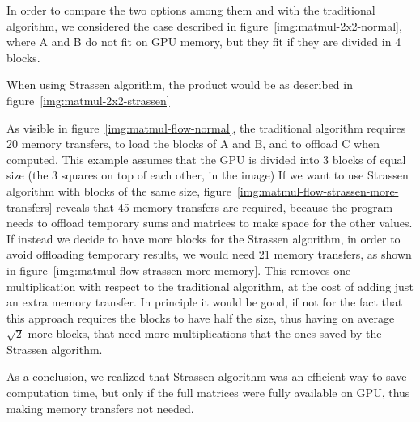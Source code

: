 In order to compare the two options among them and with the traditional algorithm, we considered the case described in figure~\ref{img:matmul-2x2-normal}, where A and B do not fit on GPU memory, but they fit if they are divided in 4 blocks.

When using Strassen algorithm, the product would be as described in figure~\ref{img:matmul-2x2-strassen}

As visible in figure~\ref{img:matmul-flow-normal}, the traditional algorithm requires 20 memory transfers, to load the blocks of A and B, and to offload C when computed.
This example assumes that the GPU is divided into 3 blocks of equal size (the 3 squares on top of each other, in the image)
If we want to use Strassen algorithm with blocks of the same size, figure~\ref{img:matmul-flow-strassen-more-transfers} reveals that 45 memory transfers are required, because the program needs to offload temporary sums and matrices to make space for the other values.
If instead we decide to have more blocks for the Strassen algorithm, in order to avoid offloading temporary results, we would need 21 memory transfers, as shown in figure~\ref{img:matmul-flow-strassen-more-memory}.
This removes one multiplication with respect to the traditional algorithm, at the cost of adding just an extra memory transfer.
In principle it would be good, if not for the fact that this approach requires the blocks to have half the size, thus having on average $\sqrt{2}$ more blocks, that need more multiplications that the ones saved by the Strassen algorithm.

As a conclusion, we realized that Strassen algorithm was an efficient way to save computation time, but only if the full matrices were fully available on GPU, thus making memory transfers not needed.
